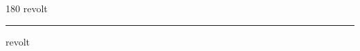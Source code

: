 
\begin{frame}
\begin{center}
\begin{turn}{180}
{\fontsize{2.5cm}{1em}\selectfont revolt}
\end{turn}
\vspace{1em}\par  
\hrule
\vspace{1em}\par  
{\fontsize{2.5cm}{1em}\selectfont revolt}
\end{center}
\end{frame}
